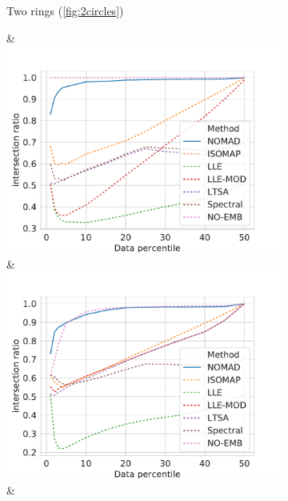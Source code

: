\documentclass[twoside,11pt]{article}
\begin{document}
\begin{figure}
\begin{subfigure}{\textwidth}
\begin{footnotesize}
\begin{tabu}
        \begin{sideways}
        	Two rings (\cref{fig:2circles})
        \end{sideways} &
		\includegraphics[width=\linewidth]{figures/geodesics/geodesics_circles_orthogonal_noise000} &
		\includegraphics[width=\linewidth]{figures/geodesics/geodesics_circles_orthogonal_noise005} &

\end{tabu}
\end{footnotesize}
\end{subfigure}
\end{figure}
\end{document}

